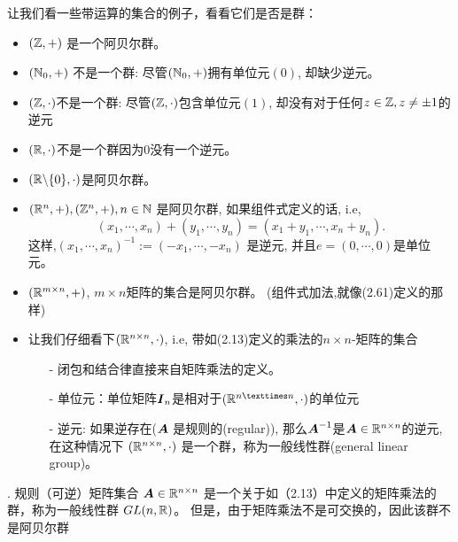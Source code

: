\begin{example}[群]
    让我们看一些带运算的集合的例子，看看它们是否是群：
    \begin{itemize}
        \item $(\mathbb{Z,+})$ 是一个阿贝尔群。
        \item $(\mathbb{N}_0,+)$ 不是一个群:
              尽管$(\mathbb{N}_0, +)$拥有单位元$(0)$, 却缺少逆元。
        \item $(\mathbb{Z},\cdot)$不是一个群:
              尽管$(\mathbb{Z},\cdot)$包含单位元$(1)$,
              却没有对于任何$z \in \mathbb{Z}, z \neq \pm 1$的逆元
        \item $(\mathbb{R}, \cdot)$不是一个群因为$0$没有一个逆元。
        \item $(\mathbb{R}\backslash\{0\}, \cdot)$是阿贝尔群。
        \item $(\mathbb{R}^n, +), (\mathbb{Z}^{n},+), n \in \mathbb{N}$
               是阿贝尔群, 如果组件式定义的话, i.e,
               \begin{equation}
                   (x_1,\cdots, x_n) + (y_1,\cdots, y_n) =
                   (x_1 + y_1, \cdots, x_n + y_n).
               \end{equation}
               这样,$(x_1,\cdots, x_n)^{-1} := (-x_1, \cdots, -x_n)$
               是逆元, 并且$e=(0,\cdots,0)$是单位元。
        \item $(\mathbb{R}^{m \times n}, +)$, $m \times n$矩阵的集合是阿贝尔群。
              (组件式加法,就像(2.61)定义的那样)
        \item 让我们仔细看下$(\mathbb{R}^{n \times n}, \cdot)$, i.e,
              带如(2.13)定义的乘法的$n \times n$-矩阵的集合
              \begin{itemize}
                  \item[-] 闭包和结合律直接来自矩阵乘法的定义。
                  \item[-] 单位元：单位矩阵$\boldsymbol{I}_n$是相对于$(\R^{n×n}, \cdot)$的单位元
                  \item[-] 逆元: 如果逆存在($\boldsymbol{A}$ 是规则的(regular)),
                           那么$\boldsymbol{A}^{-1}$是$\boldsymbol{A} \in \mathbb{R}^{n \times n}$的逆元,
                           在这种情况下 $(\mathbb{R}^{n \times n}, \cdot)$ 是一个群，称为一般线性群(general linear group)。
              \end{itemize}
    \end{itemize}
\end{example}
\begin{definition}[一般线性群].
    规则（可逆）矩阵集合 $\boldsymbol{A}\in \mathbb{R}^{n \times n}$
    是一个关于如（2.13）中定义的矩阵乘法的群，称为一般线性群
    $GL(n, \mathbb{R})$。
    但是，由于矩阵乘法不是可交换的，因此该群不是阿贝尔群
\end{definition}

